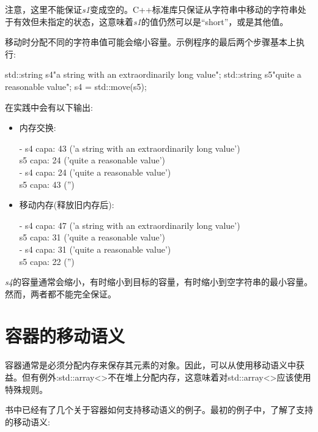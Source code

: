 注意，这里不能保证\textit{s1}变成空的。C++标准库只保证从字符串中移动的字符串处于有效但未指定的状态，这意味着\textit{s1}的值仍然可以是“short”，或是其他值。\par

移动时分配不同的字符串值可能会缩小容量。示例程序的最后两个步骤基本上执行:\par

\begin{codebox}[cpp]
std::string s4{"a string with an extraordinarily long value"};
std::string s5{"quite a reasonable value"};
s4 = std::move(s5);
\end{codebox}

在实践中会有以下输出:\par

\begin{itemize}
  \item 内存交换:
  \begin{myOutput}
  - s4 capa: 43 ('a string with an extraordinarily long value') \\
  s5 capa: 24 ('quite a reasonable value') \\
  - s4 capa: 24 ('quite a reasonable value') \\
  s5 capa: 43 ('')
  \end{myOutput}
  \item 移动内存(释放旧内存后):
  \begin{myOutput}
  - s4 capa: 47 ('a string with an extraordinarily long value') \\
  s5 capa: 31 ('quite a reasonable value') \\
  - s4 capa: 31 ('quite a reasonable value') \\
  s5 capa: 22 ('')
  \end{myOutput}
\end{itemize}

\textit{s4}的容量通常会缩小，有时缩小到目标的容量，有时缩小到空字符串的最小容量。然而，两者都不能完全保证。\par


\section{容器的移动语义}

容器通常是必须分配内存来保存其元素的对象。因此，可以从使用移动语义中获益。但有例外:std::\allowbreak{}array<\allowbreak{}>不在堆上分配内存，这意味着对std::array<>应该使用特殊规则。\par

书中已经有了几个关于容器如何支持移动语义的例子。最初的例子中，了解了支持的移动语义:\par

